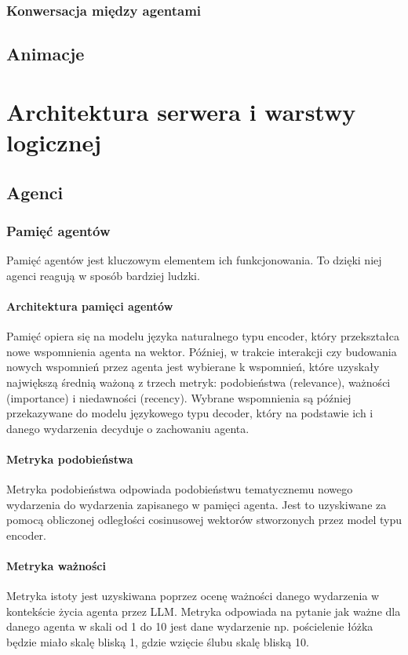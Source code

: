 \subsubsection{Konwersacja między agentami}

\subsection{Animacje}


\section{Architektura serwera i warstwy logicznej}
\label{sec:architektura_serwera}

\subsection{Agenci}

\subsubsection{Pamięć agentów}
Pamięć agentów jest kluczowym elementem ich funkcjonowania.
To dzięki niej agenci reagują w sposób bardziej ludzki.

\paragraph{Architektura pamięci agentów}
Pamięć opiera się na modelu języka naturalnego typu encoder, który przekształca
nowe wspomnienia agenta na wektor. Później, w trakcie interakcji czy budowania nowych
wspomnień przez agenta jest wybierane k wspomnień, które uzyskały największą średnią
ważoną z trzech metryk: podobieństwa (relevance), ważności (importance) i niedawności (recency).
Wybrane wspomnienia są później przekazywane do modelu językowego typu decoder, który na
podstawie ich i danego wydarzenia decyduje o zachowaniu agenta.

\paragraph{Metryka podobieństwa}
Metryka podobieństwa odpowiada podobieństwu tematycznemu nowego wydarzenia do
wydarzenia zapisanego w pamięci agenta. Jest to uzyskiwane za pomocą obliczonej
odległości cosinusowej wektorów stworzonych przez model typu encoder.

\paragraph{Metryka ważności}
Metryka istoty jest uzyskiwana
poprzez ocenę ważności danego wydarzenia w kontekście życia agenta przez LLM.
Metryka odpowiada na pytanie jak ważne dla danego agenta w skali od 1 do 10 jest
dane wydarzenie np. pościelenie łóżka będzie miało skalę bliską 1, gdzie wzięcie
ślubu skalę bliską 10.

